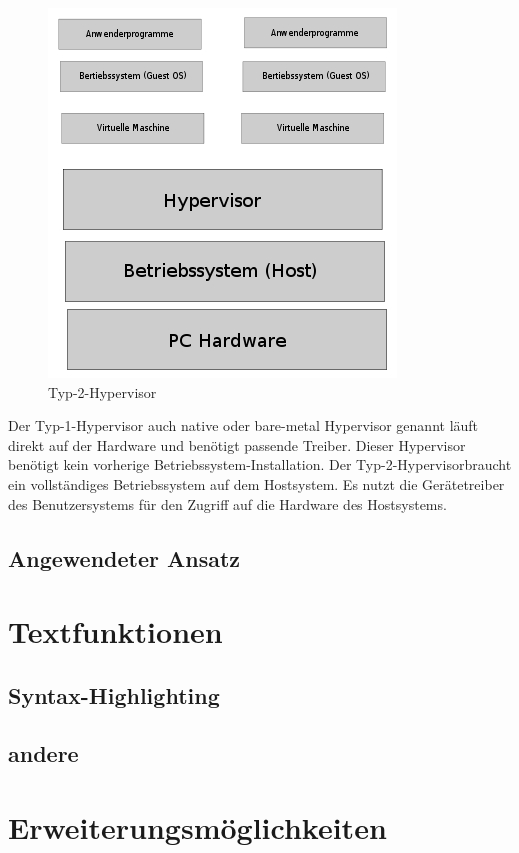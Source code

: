 \documentclass[10pt]{article}
\begin{document}
\begin{figure}[!tbp]
\begin{minipage}[b]{0.4\textwidth}
    \includegraphics[width=\textwidth]{Bilder/hypervisorTyp2.jpg}
    \caption{Typ-2-Hypervisor}
  \end{minipage}
\end{figure}
	
	Der Typ-1-Hypervisor auch native oder bare-metal Hypervisor genannt läuft direkt auf der Hardware und benötigt passende Treiber. Dieser Hypervisor benötigt kein vorherige Betriebssystem-Installation. 
	Der Typ-2-Hypervisorbraucht ein vollständiges Betriebssystem auf dem Hostsystem. Es nutzt die Gerätetreiber des Benutzersystems für den Zugriff auf die Hardware des Hostsystems. 
	
	
	
	\pagebreak
	\subsection{Angewendeter Ansatz}
	\pagebreak
	\section{Textfunktionen}
	\subsection{Syntax-Highlighting}
	\subsection{andere}
	\pagebreak
	\section{Erweiterungsmöglichkeiten}
	\pagebreak
	\listoffigures
	
	
\end{document}

